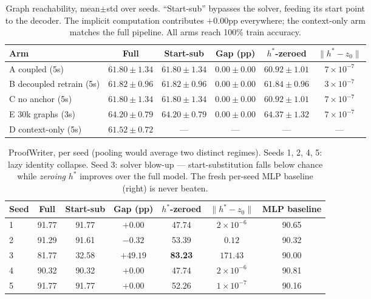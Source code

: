 \documentclass[11pt]{article}
\newcommand{\hstar}{h^{*}}
\newcommand{\zzero}{z_{0}}
\begin{document}
\begin{table}[t]\centering\small
\caption{Graph reachability, mean$\pm$std over seeds. ``Start-sub''
bypasses the solver, feeding its start point to the decoder. The
implicit computation contributes $+0.00$pp everywhere; the context-only
arm matches the full pipeline. All arms reach 100\% train accuracy.}
\label{tab:arms}
\begin{tabular}{lccccc}\toprule
Arm & Full & Start-sub & Gap (pp) & $\hstar$-zeroed & $\lVert\hstar-\zzero\rVert$\\\midrule
A coupled (5s) & $61.80\pm1.34$ & $61.80\pm1.34$ & $0.00\pm0.00$ & $60.92\pm1.01$ & $7{\times}10^{-7}$\\
B decoupled retrain (5s) & $61.82\pm0.96$ & $61.82\pm0.96$ & $0.00\pm0.00$ & $61.84\pm0.96$ & $3{\times}10^{-7}$\\
C no anchor (5s) & $61.80\pm1.34$ & $61.80\pm1.34$ & $0.00\pm0.00$ & $60.92\pm1.01$ & $7{\times}10^{-7}$\\
E $30$k graphs (3s) & $64.20\pm0.79$ & $64.20\pm0.79$ & $0.00\pm0.00$ & $64.37\pm1.32$ & $7{\times}10^{-7}$\\\midrule
D context-only (5s) & $61.52\pm0.72$ & --- & --- & --- & ---\\
\bottomrule\end{tabular}\end{table}

\begin{table}[t]\centering\small
\caption{ProofWriter, per seed (pooling would average two distinct
regimes). Seeds 1, 2, 4, 5: lazy identity collapse. Seed 3: solver
blow-up --- start-substitution falls below chance while \emph{zeroing}
$\hstar$ improves over the full model. The fresh per-seed MLP baseline
(right) is never beaten.}\label{tab:pw}
\begin{tabular}{lcccccc}\toprule
Seed & Full & Start-sub & Gap (pp) & $\hstar$-zeroed & $\lVert\hstar-\zzero\rVert$ & MLP baseline\\\midrule
1 & 91.77 & 91.77 & $+0.00$ & 47.74 & $2{\times}10^{-6}$ & 90.65\\
2 & 91.29 & 91.61 & $-0.32$ & 53.39 & $0.12$ & 90.32\\
3 & 81.77 & 32.58 & $+49.19$ & \textbf{83.23} & $\mathbf{171.43}$ & 90.00\\
4 & 90.32 & 90.32 & $+0.00$ & 47.74 & $2{\times}10^{-6}$ & 90.81\\
5 & 91.77 & 91.77 & $+0.00$ & 52.26 & $1{\times}10^{-7}$ & 90.16\\
\bottomrule\end{tabular}\end{table}
\end{document}
